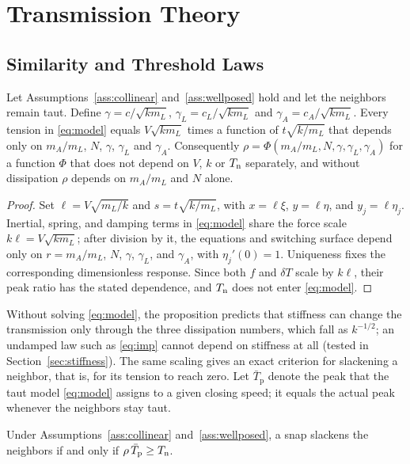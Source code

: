 \section{Transmission Theory}\label{sec:theory}

\subsection{Similarity and Threshold Laws}\label{sec:similarity}

\begin{proposition}\label{prop:similarity}
Let Assumptions~\ref{ass:collinear} and~\ref{ass:wellposed} hold and let the neighbors remain taut. Define $\gamma = c/\sqrt{k m_L}$, $\gamma_L = c_L/\sqrt{k m_L}$ and $\gamma_A = c_A/\sqrt{k m_L}$. Every tension in \eqref{eq:model} equals $V\sqrt{k m_L}$ times a function of $t\sqrt{k/m_L}$ that depends only on $m_A/m_L$, $N$, $\gamma$, $\gamma_L$ and $\gamma_A$. Consequently $\rho=\Phi(m_A/m_L,N,\gamma,\gamma_L,\gamma_A)$ for a function $\Phi$ that does not depend on $V$, $k$ or $T_{\mathrm{n}}$ separately, and without dissipation $\rho$ depends on $m_A/m_L$ and $N$ alone.
\end{proposition}

\begin{proof}
Set $\ell=V\sqrt{m_L/k}$ and $s=t\sqrt{k/m_L}$, with $x=\ell\xi$, $y=\ell\eta$, and $y_j=\ell\eta_j$. Inertial, spring, and damping terms in \eqref{eq:model} share the force scale $k\ell=V\sqrt{k m_L}$; after division by it, the equations and switching surface depend only on $r=m_A/m_L$, $N$, $\gamma$, $\gamma_L$, and $\gamma_A$, with $\eta_j'(0)=1$. Uniqueness fixes the corresponding dimensionless response. Since both $f$ and $\delta T$ scale by $k\ell$, their peak ratio has the stated dependence, and $T_{\mathrm{n}}$ does not enter \eqref{eq:model}.
\end{proof}

Without solving \eqref{eq:model}, the proposition predicts that stiffness can change the transmission only through the three dissipation numbers, which fall as $k^{-1/2}$; an undamped law such as \eqref{eq:imp} cannot depend on stiffness at all (tested in Section~\ref{sec:stiffness}). The same scaling gives an exact criterion for slackening a neighbor, that is, for its tension to reach zero. Let $\bar T_{\mathrm p}$ denote the peak that the taut model \eqref{eq:model} assigns to a given closing speed; it equals the actual peak whenever the neighbors stay taut.

\begin{corollary}\label{cor:threshold}
Under Assumptions~\ref{ass:collinear} and~\ref{ass:wellposed}, a snap slackens the neighbors if and only if $\rho\,\bar T_{\mathrm p}\ge T_{\mathrm{n}}$.
\end{corollary}

